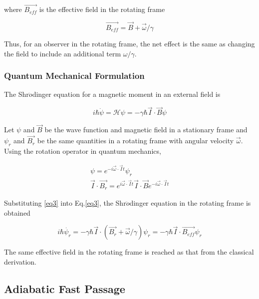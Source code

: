 where $\vec{B_{eff}}$ is the effective field in the rotating frame

\begin{equation}
\vec{B_{eff}}=\vec{B} + \vec{\omega}/\gamma
\end{equation}

Thus, for an observer in the rotating frame, the net effect is the same as changing the field to include an additional term $\omega/\gamma$.

\subsubsection{Quantum Mechanical Formulation}

The Shr$\ddot{o}$dinger equation for a magnetic moment in an external field is

\begin{equation}\label{eq3}
i\hbar \dot{\psi}=\mathcal{H} \psi=-\gamma \hbar \vec{I}\cdot \vec{B} \psi
\end{equation}

Let $\psi$ and $\vec{B}$ be the wave function and magnetic field in a stationary frame and $\psi_{r}$ and $\vec{B_{r}}$ be the same quantities in a rotating frame with angular velocity $\vec{\omega}$. Using the rotation operator in quantum mechanics, 

\begin{subequations}\label{eq4}
	\begin{gather}
	\psi=e^{-i\vec{\omega}\cdot \vec{I}t}\psi_{r} \\
	\vec{I}\cdot \vec{B_{r}} = e^{i\vec{\omega}\cdot \vec{I}t}\vec{I}\cdot \vec{B} e^{-i\vec{\omega}\cdot \vec{I}t}
	\end{gather}
\end{subequations}

Substituting \ref{eq3} into Eq.\ref{eq3}, the Shr$\ddot{o}$dinger equation in the rotating frame is obtained

\begin{equation}
i\hbar \dot{\psi_{r}}=-\gamma \hbar \vec{I}\cdot(\vec{B_{r}} + \vec{\omega}/\gamma)\psi_{r}=-\gamma \hbar \vec{I}\cdot\vec{B_{eff}}\psi_{r}
\end{equation}

The same effective field in the rotating frame is reached as that from the classical derivation.

\subsection{Adiabatic Fast Passage}









